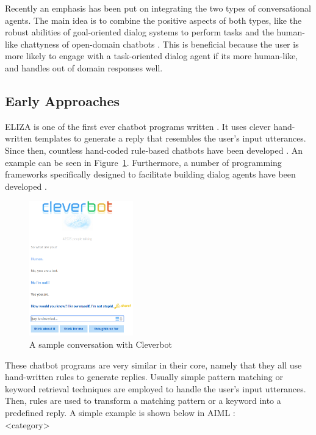 \documentclass[12pt]{article}
\begin{document}
Recently an emphasis has been put on integrating the two types of conversational agents. The main idea is to combine the positive aspects of both types, like the robust abilities of goal-oriented dialog systems to perform tasks and the human-like chattyness of open-domain chatbots \cite{Zhao:2017,Yu:2017,Serban:2017}. This is beneficial because the user is more likely to engage with a task-oriented dialog agent if its more human-like, and handles out of domain responses well.

\subsection{Early Approaches} \label{ssec:22}

ELIZA is one of the first ever chatbot programs written \cite{Weizenbaum:1966}. It uses clever hand-written templates to generate a reply that resembles the user's input utterances. Since then, countless hand-coded rule-based chatbots have been developed \cite{Wallace:2009,Cleverbot:2017,Mitsuku:2017}. An example can be seen in Figure~\ref{fig:22a}. Furthermore, a number of programming frameworks specifically designed to facilitate building dialog agents have been developed \cite{Marietto:2013,Microsoft:2017}.

\begin{figure}[H]
	\centering
	\includegraphics[width=0.4\textwidth]{pics/cleverbot.png}
	\caption{A sample conversation with Cleverbot \cite{Cleverbot:2017}}
	\label{fig:22a}
\end{figure}


These chatbot programs are very similar in their core, namely that they all use hand-written rules to generate replies. Usually simple pattern matching or keyword retrieval techniques are employed to handle the user's input utterances. Then, rules are used to transform a matching pattern or a keyword into a predefined reply.
A simple example is shown below in AIML \cite{Marietto:2013}:\\
{\color{OliveGreen}\textless category\textgreater}
\end{document}

